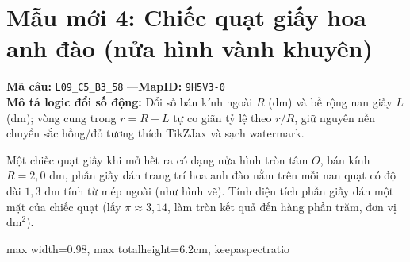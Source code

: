 \documentclass[10pt,a4paper]{article}
\begin{document}
\newpage


\section{Mẫu mới 4: Chiếc quạt giấy hoa anh đào (nửa hình vành khuyên)}
\noindent\textbf{Mã câu:} \texttt{L09\_C5\_B3\_58} \quad---\quad \textbf{MapID:} \texttt{9H5V3-0}\\[2mm]
\textbf{Mô tả logic đổi số động:} Đổi số bán kính ngoài $R$ (dm) và bề rộng nan giấy $L$ (dm); vòng cung trong $r = R - L$ tự co giãn tỷ lệ theo $r/R$, giữ nguyên nền chuyển sắc hồng/đỏ tương thích TikZJax và sạch watermark.\\[3mm]
\noindent
\begin{minipage}[t]{0.49\textwidth}
\vspace{0pt}
\begin{tcolorbox}[colback=teal!4!white,colframe=teal!70!black,title={\textbf{BIẾN THỂ ĐỔI SỐ 1 (Đáp số: 5,51)}},top=2mm,bottom=2mm,left=2mm,right=2mm]
{\small Một chiếc quạt giấy khi mở hết ra có dạng nửa hình tròn tâm $O$, bán kính $R = 2{,}0\text{ dm}$, phần giấy dán trang trí hoa anh đào nằm trên mỗi nan quạt có độ dài $1{,}3\text{ dm}$ tính từ mép ngoài (như hình vẽ). Tính diện tích phần giấy dán một mặt của chiếc quạt (lấy $\pi \approx 3{,}14$, làm tròn kết quả đến hàng phần trăm, đơn vị $\text{dm}^2$).}\par\vspace{2mm}
\begin{center}
\begin{adjustbox}{max width=0.98\linewidth, max totalheight=6.2cm, keepaspectratio}
\end{adjustbox}
\end{center}
\end{tcolorbox}
\end{minipage}
\end{document}
